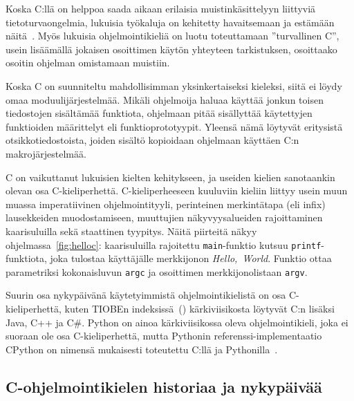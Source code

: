 Koska C:llä on helppoa saada aikaan erilaisia muistinkäsittelyyn liittyviä
tietoturvaongelmia, lukuisia työkaluja on kehitetty havaitsemaan ja estämään
näitä~\citep[mm.][]{valgrind,asan}. Myös lukuisia ohjelmointikieliä on luotu
toteuttamaan ''turvallinen C'', usein lisäämällä jokaisen osoittimen käytön
yhteyteen tarkistuksen, osoittaako osoitin ohjelman omistamaan muistiin.


Koska C on suunniteltu mahdollisimman yksinkertaiseksi kieleksi, siitä ei löydy
omaa moduulijärjestelmää. Mikäli ohjelmoija haluaa käyttää jonkun toisen
tiedostojen sisältämää funktiota, ohjelmaan pitää sisällyttää käytettyjen
funktioiden määrittelyt eli funktioprototyypit. Yleensä nämä löytyvät
eritysistä otsikkotiedostoista, joiden sisältö kopioidaan ohjelmaan käyttäen
C:n makrojärjestelmää.

C on vaikuttanut lukuisien kielten kehitykseen, ja useiden kielien sanotaankin
olevan osa C-kieliperhettä. C-kieliperheeseen kuuluviin kieliin liittyy usein
muun muassa imperatiivinen ohjelmointityyli, perinteinen merkintätapa (eli
infix) lausekkeiden muodostamiseen, muuttujien näkyvyysalueiden rajoittaminen
kaarisuluilla sekä staattinen tyypitys. Näitä piirteitä näkyy
ohjelmassa~\ref{fig:helloc}: kaarisuluilla rajoitettu \texttt{main}-funktio
kutsuu \texttt{printf}-funktiota, joka tulostaa käyttäjälle merkkijonon
\emph{Hello,~World}. Funktio ottaa parametriksi kokonaisluvun \texttt{argc} ja
osoittimen merkkijonolistaan \texttt{argv}.

Suurin osa nykypäivänä käytetyimmistä ohjelmointikielistä on osa
C-kieliperhettä, kuten TIOBEn indeksissä~(\citeyear{tiobe}) kärkiviisikosta
löytyvät C:n lisäksi Java, C++ ja C\#. Python on ainoa kärkiviisikossa oleva
ohjelmointikieli, joka ei suoraan ole osa C-kieliperhettä, mutta Pythonin
referenssi-implementaatio CPython on nimensä mukaisesti toteutettu
C:llä ja Pythonilla~\citep{cpython}.

\subsection{C-ohjelmointikielen historiaa ja nykypäivää}
\label{sec:ctaustaa}

